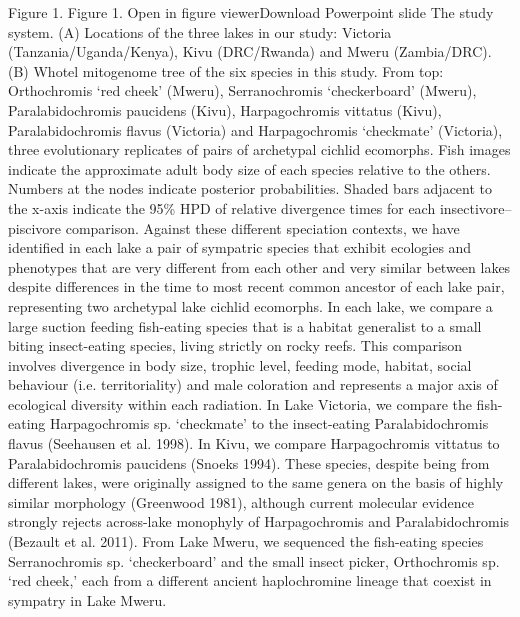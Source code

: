 Figure 1. 
Figure 1. Open in figure viewerDownload Powerpoint slide
The study system. (A) Locations of the three lakes in our study: Victoria (Tanzania/Uganda/Kenya), Kivu (DRC/Rwanda) and Mweru (Zambia/DRC). (B) Whotel mitogenome tree of the six species in this study. From top: Orthochromis ‘red cheek’ (Mweru), Serranochromis ‘checkerboard’ (Mweru), Paralabidochromis paucidens (Kivu), Harpagochromis vittatus (Kivu), Paralabidochromis flavus (Victoria) and Harpagochromis ‘checkmate’ (Victoria), three evolutionary replicates of pairs of archetypal cichlid ecomorphs. Fish images indicate the approximate adult body size of each species relative to the others. Numbers at the nodes indicate posterior probabilities. Shaded bars adjacent to the x-axis indicate the 95\% HPD of relative divergence times for each insectivore–piscivore comparison.
Against these different speciation contexts, we have identified in each lake a pair of sympatric species that exhibit ecologies and phenotypes that are very different from each other and very similar between lakes despite differences in the time to most recent common ancestor of each lake pair, representing two archetypal lake cichlid ecomorphs. In each lake, we compare a large suction feeding fish-eating species that is a habitat generalist to a small biting insect-eating species, living strictly on rocky reefs. This comparison involves divergence in body size, trophic level, feeding mode, habitat, social behaviour (i.e. territoriality) and male coloration and represents a major axis of ecological diversity within each radiation. In Lake Victoria, we compare the fish-eating Harpagochromis sp. ‘checkmate’ to the insect-eating Paralabidochromis flavus (Seehausen et al. 1998). In Kivu, we compare Harpagochromis vittatus to Paralabidochromis paucidens (Snoeks 1994). These species, despite being from different lakes, were originally assigned to the same genera on the basis of highly similar morphology (Greenwood 1981), although current molecular evidence strongly rejects across-lake monophyly of Harpagochromis and Paralabidochromis (Bezault et al. 2011). From Lake Mweru, we sequenced the fish-eating species Serranochromis sp. `checkerboard' and the small insect picker, Orthochromis sp. `red cheek,' each from a different ancient haplochromine lineage that coexist in sympatry in Lake Mweru.

